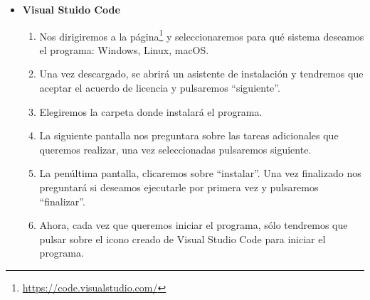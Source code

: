 \begin{itemize}
Para descargar el programa XAMPP, tendremos que seguir los siguientes pasos:	
	\begin{enumerate}
		\item Iremos a la página\footnote{\url{https://www.apachefriends.org/index.html}}.
		\item Elegiremos la versión en la que ejecutaremos XAMPP (Windows, Linux o iOS.
		\item Una vez descargado, buscaremos el archivo ``xampp-win32-7.2.4-0-VC15-installer'' y ejecutaremos el archivo.
		\item Cuando se abra la primera pantalla, haremos clic en \textit{Yes}.
		\item A continuación seleccionaremos las funciones XAMPP que deseamos instalar, en nuestro caso seleccionamos todas ellas, será la forma predeterminada y pulsaremos ``\textit{Next}''.
		\item Seleccionaremos la ubicación donde deseemos instalar el programa. Una vez ubicado pulsaremos ``\textit{Next}''.
		\item En la penúltima pantalla desmarcaremos la opción de ``textit{Learn more about Bitnami for XAMPP}'' ``Aprender más sobre Bitnami'' y clicamos ``\textit{Next}''.
		\item Con esto empezará a instalar XAMPP en la carpeta seleccionada. Pulsaremos \textit{Finish}, esto cerrará la ventana y abrirá el panel de control de XAMPP y aquí accedemos a los servidores. Antes de ello, tendremos que seleccionar el idioma que deseemos. 
	\end{enumerate}	
	\item \textbf{Visual Stuido Code}
	\begin{enumerate}
		\item Nos dirigiremos a la página\footnote{\url{https://code.visualstudio.com/}} y seleccionaremos para qué sistema deseamos el programa: Windows, Linux, macOS.
		\item Una vez descargado, se abrirá un asistente de instalación y tendremos que aceptar el acuerdo de licencia y pulsaremos ``siguiente''.
		\item Elegiremos la carpeta donde instalará el programa.
		\item La siguiente pantalla nos preguntara sobre las tareas adicionales que queremos realizar, una vez seleccionadas pulsaremos siguiente.
		 \item La penúltima pantalla, clicaremos sobre ``instalar''. Una vez finalizado nos preguntará si deseamos ejecutarle por primera vez y pulsaremos ``finalizar''.
		 \item  Ahora, cada vez que queremos iniciar el programa, sólo tendremos que pulsar sobre el icono creado de Visual Studio Code para iniciar el programa. 
	\end{enumerate}	
\end{itemize}

